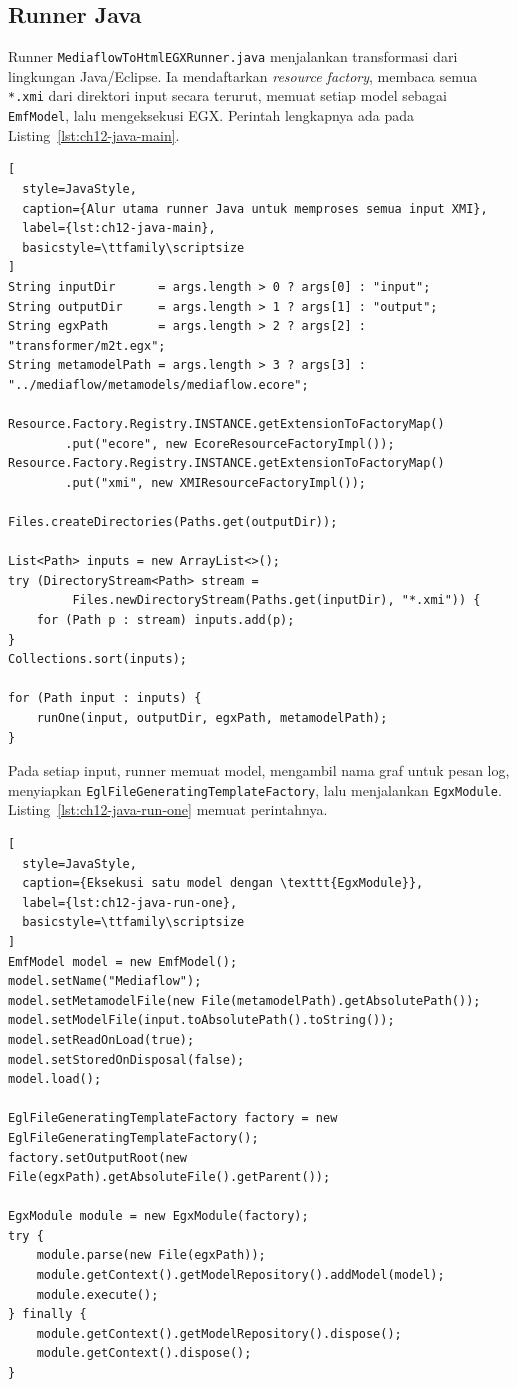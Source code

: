 \subsection{Runner Java}

Runner \texttt{MediaflowToHtmlEGXRunner.java} menjalankan transformasi dari lingkungan Java/Eclipse. Ia mendaftarkan \textit{resource factory}, membaca semua \texttt{*.xmi} dari direktori input secara terurut, memuat setiap model sebagai \texttt{EmfModel}, lalu mengeksekusi EGX. Perintah lengkapnya ada pada Listing~\ref{lst:ch12-java-main}.

\begin{lstlisting}[
  style=JavaStyle,
  caption={Alur utama runner Java untuk memproses semua input XMI},
  label={lst:ch12-java-main},
  basicstyle=\ttfamily\scriptsize
]
String inputDir      = args.length > 0 ? args[0] : "input";
String outputDir     = args.length > 1 ? args[1] : "output";
String egxPath       = args.length > 2 ? args[2] : "transformer/m2t.egx";
String metamodelPath = args.length > 3 ? args[3] : "../mediaflow/metamodels/mediaflow.ecore";

Resource.Factory.Registry.INSTANCE.getExtensionToFactoryMap()
        .put("ecore", new EcoreResourceFactoryImpl());
Resource.Factory.Registry.INSTANCE.getExtensionToFactoryMap()
        .put("xmi", new XMIResourceFactoryImpl());

Files.createDirectories(Paths.get(outputDir));

List<Path> inputs = new ArrayList<>();
try (DirectoryStream<Path> stream =
         Files.newDirectoryStream(Paths.get(inputDir), "*.xmi")) {
    for (Path p : stream) inputs.add(p);
}
Collections.sort(inputs);

for (Path input : inputs) {
    runOne(input, outputDir, egxPath, metamodelPath);
}
\end{lstlisting}

Pada setiap input, runner memuat model, mengambil nama graf untuk pesan log, menyiapkan \texttt{EglFileGeneratingTemplateFactory}, lalu menjalankan \texttt{EgxModule}. Listing~\ref{lst:ch12-java-run-one} memuat perintahnya.

\begin{lstlisting}[
  style=JavaStyle,
  caption={Eksekusi satu model dengan \texttt{EgxModule}},
  label={lst:ch12-java-run-one},
  basicstyle=\ttfamily\scriptsize
]
EmfModel model = new EmfModel();
model.setName("Mediaflow");
model.setMetamodelFile(new File(metamodelPath).getAbsolutePath());
model.setModelFile(input.toAbsolutePath().toString());
model.setReadOnLoad(true);
model.setStoredOnDisposal(false);
model.load();

EglFileGeneratingTemplateFactory factory = new EglFileGeneratingTemplateFactory();
factory.setOutputRoot(new File(egxPath).getAbsoluteFile().getParent());

EgxModule module = new EgxModule(factory);
try {
    module.parse(new File(egxPath));
    module.getContext().getModelRepository().addModel(model);
    module.execute();
} finally {
    module.getContext().getModelRepository().dispose();
    module.getContext().dispose();
}
\end{lstlisting}

